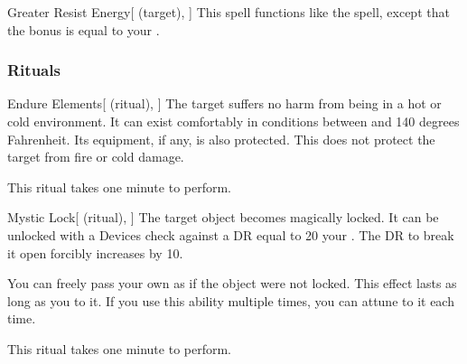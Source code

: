 \lowercase{\hypertarget{spell:Greater Resist Energy}{}}\label{spell:Greater Resist Energy}
\begin{attuneability}[Rank 7]{\hypertarget{spell:Greater Resist Energy}{Greater Resist Energy}}[ (target), ]
This spell functions like the  spell, except that the bonus is equal to your .
\end{attuneability}
\vspace{0.25em}



\subsubsection{Rituals}


\lowercase{\hypertarget{spell:Endure Elements}{}}\label{spell:Endure Elements}
\begin{attuneability}[Rank 1]{\hypertarget{spell:Endure Elements}{Endure Elements}}[ (ritual), ]
The target suffers no harm from being in a hot or cold environment.
It can exist comfortably in conditions between  and 140 degrees Fahrenheit.
Its equipment, if any, is also protected.
This does not protect the target from fire or cold damage.

This ritual takes one minute to perform.
\end{attuneability}
\vspace{0.25em}



\lowercase{\hypertarget{spell:Mystic Lock}{}}\label{spell:Mystic Lock}
\begin{attuneability}[Rank 3]{\hypertarget{spell:Mystic Lock}{Mystic Lock}}[ (ritual), ]
The target object becomes magically locked.
It can be unlocked with a Devices check against a DR equal to 20 \add your .
The DR to break it open forcibly increases by 10.

You can freely pass your own  as if the object were not locked.
This effect lasts as long as you  to it.
If you use this ability multiple times, you can attune to it each time.

This ritual takes one minute to perform.
\end{attuneability}
\vspace{0.25em}



